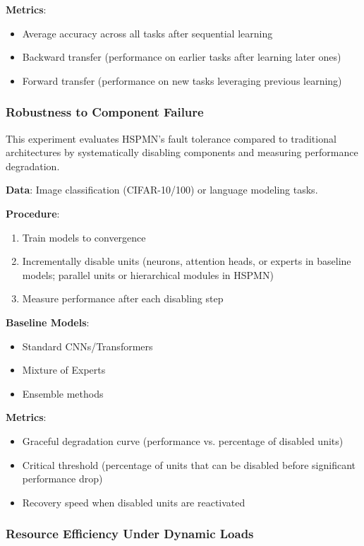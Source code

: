 \documentclass[11pt,a4paper,twocolumn]{article}
\begin{document}
\textbf{Metrics}:
\begin{itemize}
    \item Average accuracy across all tasks after sequential learning
    \item Backward transfer (performance on earlier tasks after learning later ones)
    \item Forward transfer (performance on new tasks leveraging previous learning)
\end{itemize}

\subsubsection{Robustness to Component Failure}

This experiment evaluates HSPMN's fault tolerance compared to traditional architectures by systematically disabling components and measuring performance degradation.

\textbf{Data}: Image classification (CIFAR-10/100) or language modeling tasks.

\textbf{Procedure}:
\begin{enumerate}
    \item Train models to convergence
    \item Incrementally disable units (neurons, attention heads, or experts in baseline models; parallel units or hierarchical modules in HSPMN)
    \item Measure performance after each disabling step
\end{enumerate}

\textbf{Baseline Models}:
\begin{itemize}
    \item Standard CNNs/Transformers
    \item Mixture of Experts
    \item Ensemble methods
\end{itemize}

\textbf{Metrics}:
\begin{itemize}
    \item Graceful degradation curve (performance vs. percentage of disabled units)
    \item Critical threshold (percentage of units that can be disabled before significant performance drop)
    \item Recovery speed when disabled units are reactivated
\end{itemize}

\subsubsection{Resource Efficiency Under Dynamic Loads}
\end{document}
